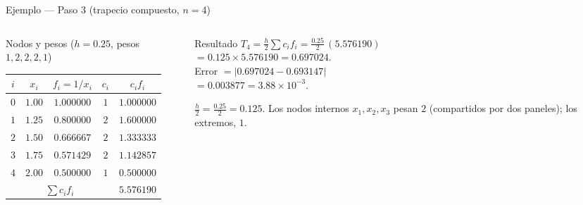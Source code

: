\documentclass[aspectratio=169,10pt]{beamer}
\begin{document}
\begin{frame}{Ejemplo — Paso 3 (trapecio compuesto, $n{=}4$)}
\begin{columns}[T]
\begin{column}{0.52\textwidth}
\begin{cardgear}{Nodos y pesos ($h{=}0.25$, pesos $1,2,2,2,1$)}{\faTable}
\centering
{\footnotesize\renewcommand{\arraystretch}{1.3}\setlength{\tabcolsep}{7pt}
\begin{tabular}{c|c|c|c|c}
$i$ & $x_i$ & $f_i=1/x_i$ & $c_i$ & $c_i f_i$\\\hline
$0$ & $1.00$ & $1.000000$ & $1$ & $1.000000$\\
$1$ & $1.25$ & $0.800000$ & $2$ & $1.600000$\\
$2$ & $1.50$ & $0.666667$ & $2$ & $1.333333$\\
$3$ & $1.75$ & $0.571429$ & $2$ & $1.142857$\\
$4$ & $2.00$ & $0.500000$ & $1$ & $0.500000$\\\hline
\multicolumn{4}{c|}{$\sum c_i f_i$} & $5.576190$\\
\end{tabular}}
\end{cardgear}
\end{column}
\begin{column}{0.46\textwidth}
\begin{cardidea}{Resultado}{\faCalculator}
{\footnotesize $\displaystyle T_4=\frac{h}{2}\sum c_i f_i=\frac{0.25}{2}\,(5.576190)$\\[0.5mm]
\hspace*{6mm}$=0.125\times5.576190=\mathbf{0.697024}$.\\[0.9mm]
Error $=|0.697024-0.693147|$\\[0.2mm]
\hspace*{9mm}$=0.003877=3.88{\times}10^{-3}$.}
\end{cardidea}
\vspace{1mm}
\begin{cardnota}[\faInfoCircle]
{\footnotesize $\tfrac{h}{2}=\tfrac{0.25}{2}=0.125$. Los nodos internos $x_1,x_2,x_3$ pesan $2$ (compartidos por dos paneles); los extremos, $1$.}
\end{cardnota}
\end{column}
\end{columns}
\end{frame}
\end{document}
